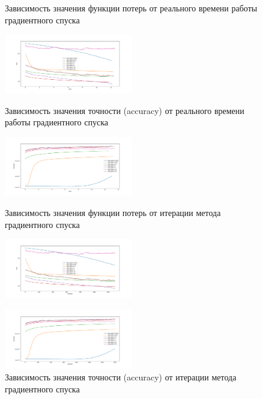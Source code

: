 \documentclass[a4paper, 11pt]{article}
\begin{document}
                 \begin{figure}[H] \label{exp1}
                     \begin{multicols}{2}
                         \begin{center}
                             \caption{Зависимость значения функции потерь от реального времени работы градиентного спуска} \label{exp1:gd_func_time}
                             \includegraphics[width=0.5\textwidth, height=0.25\textheight]{../graphs/exp1_func_GD_alpha_time_beta=0,001.pdf}
                             
                             \caption{Зависимость значения точности (accuracy) от реального времени работы градиентного спуска} \label{exp1:gd_acc_time}
                             \includegraphics[width=0.5\textwidth, height=0.25\textheight]{../graphs/exp1_accuracy_GD_alpha_time_beta=0,001.pdf}
                             
                             \caption{Зависимость значения функции потерь от итерации метода градиентного спуска} \label{exp1:gd_func_iter}
                             \includegraphics[width=0.5\textwidth, height=0.25\textheight]{../graphs/exp1_func_GD_alpha_iteration_beta=0,001.pdf}
                             
                             \caption{Зависимость значения точности (accuracy) от итерации метода градиентного спуска} \label{exp1:gd_acc_iter}
                             \includegraphics[width=0.5\textwidth, height=0.25\textheight]{../graphs/exp1_accuracy_GD_alpha_iteration_beta=0,001.pdf}
                         \end{center}
                     \end{multicols}
                 \end{figure}
\end{document}
